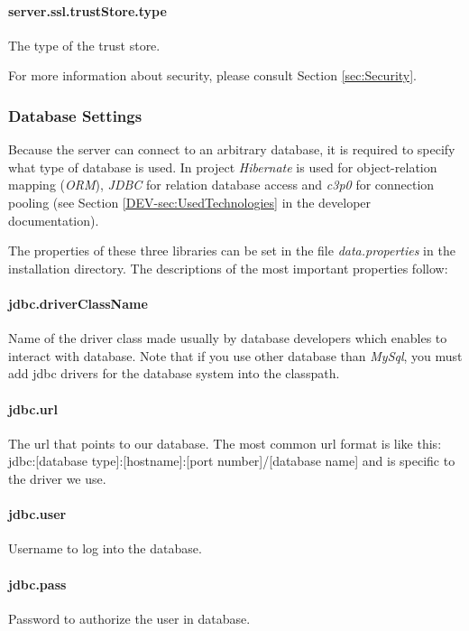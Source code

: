 \paragraph{server.ssl.trustStore.type}
The type of the trust store.

\vspace{0.75cm}
For more information about security, please consult Section \ref{sec:Security}.

\subsubsection{Database Settings}
\label{sssec:DataSettings}

Because the server can connect to an arbitrary database, it is required to
specify what type of database is used. In \textan{} project \emph{Hibernate}
is used for object-relation mapping (\emph{ORM}), \emph{JDBC} for relation
database access and \emph{c3p0} for connection pooling (see Section
\ref{DEV-sec:UsedTechnologies} in the developer documentation).

The properties of these three libraries can be set in the file
\emph{data.properties} in the installation directory. The descriptions of the
most important properties follow:

\paragraph{jdbc.driverClassName}
Name of the driver class made usually by database developers which enables to
interact with database. Note that if you use other database than \emph{MySql},
you must add jdbc drivers for the database system into the classpath.

\paragraph{jdbc.url}
 The url that points to our database. The most common url format is like this:
jdbc:[database type]:[hostname]:[port number]/[database name]
and is specific to the driver we use.

\paragraph{jdbc.user}
Username to log into the database.

\paragraph{jdbc.pass}
Password to authorize the user in database.

